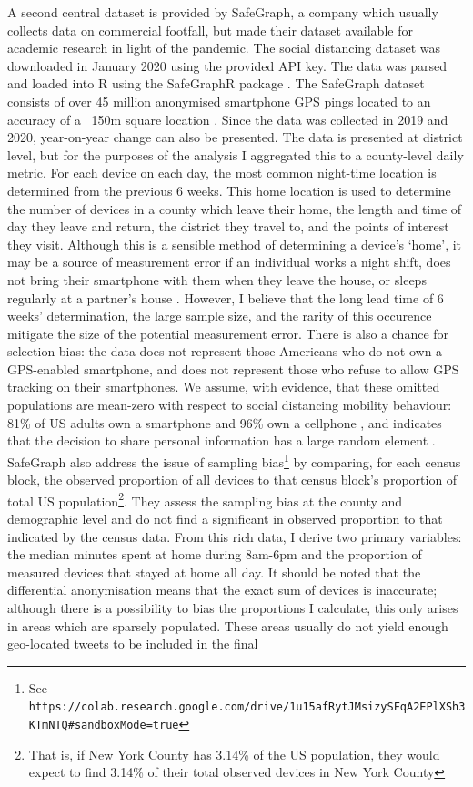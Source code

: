 \documentclass[12pt,a4]{article}
\begin{document}
A second central dataset is provided by SafeGraph, a company which usually collects data on commercial footfall, but made their dataset available for academic research in light of the pandemic. The social distancing dataset was downloaded in January 2020 using the provided API key. The data was parsed and loaded into R using the SafeGraphR package \parencite{huntington-kleinSafeGraphR2020}. The SafeGraph dataset consists of over 45 million anonymised smartphone GPS pings located to an accuracy of a ~150m square location \parencite{safegraphinc.SocialDistancingMetrics2020}. Since the data was collected in 2019 and 2020, year-on-year change can also be presented. The data is presented at district level, but for the purposes of the analysis I aggregated this to a county-level daily metric. For each device on each day, the most common night-time location is determined from the previous 6 weeks. This home location is used to determine the number of devices in a county which leave their home, the length and time of day they leave and return, the district they travel to, and the points of interest they visit. Although this is a sensible method of determining a device's `home', it may be a source of measurement error if an individual works a night shift, does not bring their smartphone with them when they leave the house, or sleeps regularly at a partner's house \parencite{chiouSocialDistancingInternet2020}. However, I believe that the long lead time of 6 weeks' determination, the large sample size, and the rarity of this occurence mitigate the size of the potential measurement error. There is also a chance for selection bias: the data does not represent those Americans who do not own a GPS-enabled smartphone, and does not represent those who refuse to allow GPS tracking on their smartphones. We assume, with evidence, that these omitted populations are mean-zero with respect to social distancing mobility behaviour: 81\% of US adults own a smartphone and 96\% own a cellphone \parencite{pewresearchcenterDemographicsMobileDevice2019}, and \parencite{atheyDigitalPrivacyParadox2017} indicates that the decision to share personal information has a large random element \parencite{chiouSocialDistancingInternet2020}. SafeGraph also address the issue of sampling bias\footnote{See \tt{https://colab.research.google.com/drive/1u15afRytJMsizySFqA2EPlXSh3KTmNTQ\#sandboxMode=true}} by comparing, for each census block, the observed proportion of all devices to that census block's proportion of total US population\footnote{That is, if New York County has 3.14\% of the US population, they would expect to find 3.14\% of their total observed devices in New York County}. They assess the sampling bias at the county and demographic level and do not find a significant in observed proportion to that indicated by the census data. From this rich data, I derive two primary variables: the median minutes spent at home during 8am-6pm and the proportion of measured devices that stayed at home all day.  It should be noted that the differential anonymisation means that the exact sum of devices is inaccurate; although there is a possibility to bias the proportions I calculate, this only arises in areas which are sparsely populated. These areas usually do not yield enough geo-located tweets to be included in the final 
\end{document}
